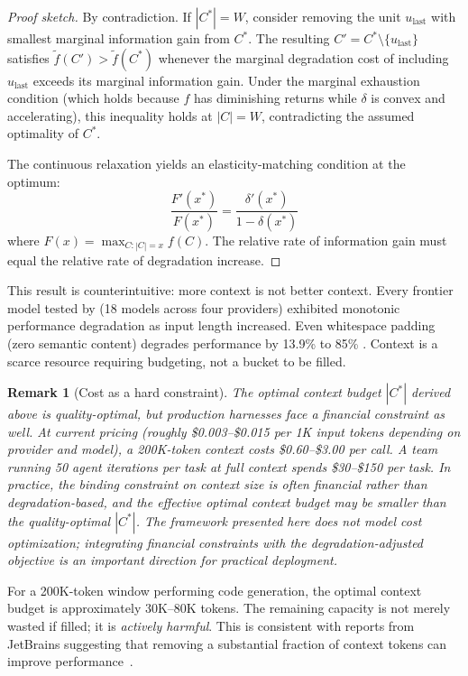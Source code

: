 \documentclass[11pt, a4paper]{googledeepmind}
\newtheorem*{remark}{Remark}
\begin{document}
\begin{proof}[Proof sketch]
By contradiction. If $|C^*| = W$, consider removing the unit $u_{\text{last}}$ with smallest marginal information gain from $C^*$. The resulting $C' = C^* \setminus \{u_{\text{last}}\}$ satisfies $\tilde{f}(C') > \tilde{f}(C^*)$ whenever the marginal degradation cost of including $u_{\text{last}}$ exceeds its marginal information gain. Under the marginal exhaustion condition (which holds because $f$ has diminishing returns while $\delta$ is convex and accelerating), this inequality holds at $|C| = W$, contradicting the assumed optimality of $C^*$.

The continuous relaxation yields an elasticity-matching condition at the optimum:
\[
    \frac{F'(x^*)}{F(x^*)} = \frac{\delta'(x^*)}{1 - \delta(x^*)}
\]
where $F(x) = \max_{C:|C|=x} f(C)$. The relative rate of information gain must equal the relative rate of degradation increase.
\end{proof}

This result is counterintuitive: more context is not better context. Every frontier model tested by \citet{chroma2025contextrot} (18 models across four providers) exhibited monotonic performance degradation as input length increased. Even whitespace padding (zero semantic content) degrades performance by 13.9\% to 85\% \citep{du2025context}. Context is a scarce resource requiring budgeting, not a bucket to be filled.

\begin{remark}[Cost as a hard constraint]
The optimal context budget $|C^*|$ derived above is quality-optimal, but production harnesses face a financial constraint as well. At current pricing (roughly \$0.003--\$0.015 per 1K input tokens depending on provider and model), a 200K-token context costs \$0.60--\$3.00 per call. A team running 50 agent iterations per task at full context spends \$30--\$150 per task. In practice, the binding constraint on context size is often financial rather than degradation-based, and the effective optimal context budget may be smaller than the quality-optimal $|C^*|$. The framework presented here does not model cost optimization; integrating financial constraints with the degradation-adjusted objective is an important direction for practical deployment.
\end{remark}

For a 200K-token window performing code generation, the optimal context budget is approximately 30K--80K tokens. The remaining capacity is not merely wasted if filled; it is \emph{actively harmful}. This is consistent with reports from JetBrains suggesting that removing a substantial fraction of context tokens can improve performance~\citep{jetbrains2025}.
\end{document}
